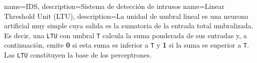     {name={IDS},          description={Sistema de detección de intrusos}}
    {name={Linear Threshold Unit (LTU)},        description={La unidad de umbral lineal es una neurona artificial muy simple cuya salida es la sumatoria de la entrada total umbralizada. Es decir, una \texttt{LTU} con umbral \texttt{T} calcula la suma ponderada de sus entradas y, a continuación, emite \textbf{0} si esta suma es inferior a \texttt{T} y \textbf{1} si la suma es superior a \texttt{T}. Las \texttt{LTU} constituyen la base de los perceptrones. \cite{mldict}}}

